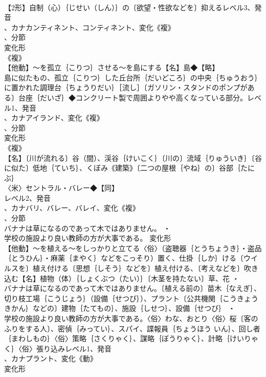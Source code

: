 \documentclass[8pt]{extreport}
\begin{document}
\begin{CJK}{UTF8}{min}
\\	【2形】自制（心）｛じせい（しん）｝の〔欲望・性欲などを〕抑えるレベル3、発音
\\	、カナカンティネント、コンティネント、変化《複》
\\	、分節
\\	変化形 
\\	《複》
\\	【他動】～を孤立｛こりつ｝させる～を島にする【名】島◆【略】
\\	島に似たもの、孤立｛こりつ｝した丘台所｛だいどころ｝の中央｛ちゅうおう｝に置かれた調理台｛ちょうりだい｝［流し］〔ガソリン・スタンドのポンプがある〕台座｛だいざ｝◆コンクリート製で周囲よりやや高くなっている部分。レベル1、発音
\\	、カナアイランド、変化《複》
\\	、分節
\\	変化形 
\\	《複》
\\	【名】〔川が流れる〕谷（間）、渓谷｛けいこく｝〔川の〕流域｛りゅういき｝〔谷に似た〕低地｛ていち｝、くぼみ《建築》〔二つの屋根｛やね｝の〕谷部｛たにぶ｝
\\	〈米〉セントラル・バレー◆【同】
\\	レベル2、発音
\\	、カナバリ、バレー、バレイ、変化《複》
\\	、分節
\\	バナナは草になるのであって木ではありません。 ・
\\	学校の施設より良い教師の方が大事である。	変化形 
\\	【他動】～を植える～をしっかりと立てる〈俗〉（盗聴器｛とうちょうき｝・盗品｛とうひん｝・麻薬｛まやく｝などをこっそり）置く、仕掛｛しか｝ける〔ウイルスを〕植え付ける〔思想｛しそう｝などを〕植え付ける、〔考えなどを〕吹き込む【名】植物（体）｛しょくぶつ（たい）｝〔木茎を持たない〕草、花 ・
\\	バナナは草になるのであって木ではありません。〔植える前の〕苗木｛なえぎ｝、切り枝工場｛こうじょう｝（設備｛せつび｝）、プラント〔公共機関｛こうきょう きかん｝などの〕建物｛たてもの｝、施設｛しせつ｝、設備｛せつび｝ ・
\\	学校の施設より良い教師の方が大事である。〈俗〉わな、おとり〈俗〉桜〔客のふりをする人〕、密偵｛みってい｝、スパイ、諜報員｛ちょうほう いん｝、回し者｛まわしもの｝〈俗〉策略｛さくりゃく｝、謀略｛ぼうりゃく｝、計略｛けいりゃく｝〈俗〉張り込みレベル1、発音
\\	、カナプラント、変化《動》
\\	変化形 

\end{CJK}
\end{document}
